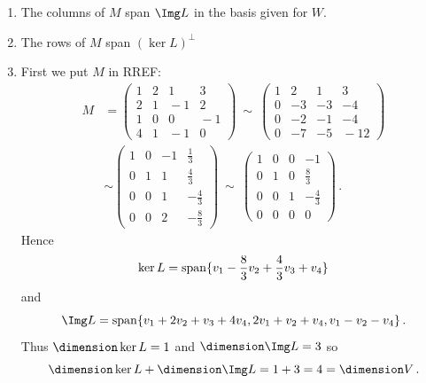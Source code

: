 \begin{enumerate}
\begin{enumerate}
\item The columns of $M$ span $\Img L$ in the basis given for $W$.
\item The rows of $M$ span $(\ker L)^\perp$%
\item First we put $M$ in RREF:
\begin{align*}
M& = \begin{pmatrix}1&2&1&3\\2&1&\!-1&2\\1&0&0&\!-1\\4&1&\!-1&0\end{pmatrix}
\ \sim\
\begin{pmatrix}1&2&1&3\\0&-3&-3&-4\\0&-2&-1&-4\\0&-7&-5&\!-12\end{pmatrix}\\[2mm]
&\sim 
\begin{pmatrix}1&0&-1&\frac13\\[1mm]0&1&1&\frac43\\[1mm]0&0&1&-\frac43\\[1mm]0&0&2&-\frac83\end{pmatrix}
\ \sim\ \begin{pmatrix}1&0&0&-1\\[1mm]0&1&0&\frac83\\[1mm]0&0&1&-\frac43\\[1mm]0&0&0&0\end{pmatrix}\, .
\end{align*}
Hence \[\ker L=\operatorname{span}\{v_1-\frac83v_2+\frac43 v_3+v_4\}\] and \[\Img L=\spa\{v_1+2v_2+v_3+4v_4,2v_1+v_2+v_4,v_1-v_2-v_4\}\, .\]
Thus $\dimension\ker L=1$ and $\dimension\Img L=3$ so \[\dimension\ker L+\dimension\Img L=1+3=4=\dimension V\, .\]
\end{enumerate}


\end{enumerate}
